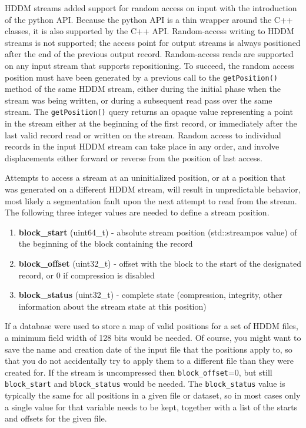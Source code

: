\documentclass{revtex4}
\begin{document}
HDDM streams added support for random access on input with the introduction
of the python API. Because the python API is a thin wrapper around the C++
classes, it is also supported by the C++ API. Random-{}access writing to HDDM
streams is not supported; the access point for output streams is always
positioned after the end of the previous output record. Random-access reads
are supported on any input stream that supports repositioning. To succeed,
the random access position must have been generated by a previous call to
the \texttt{getPosition()} method of the same HDDM stream, either during the
initial phase when the stream was being written, or during a subsequent read
pass over the same stream. The \texttt{getPosition()} query returns an opaque
value representing a point in the stream either at the beginning of the first
record, or immediately after the last valid record read or written on the 
stream. Random access to individual records in the input HDDM stream can
take place in any order, and involve displacements either forward or reverse
from the position of last access. 

Attempts to access a stream at an uninitialized position, or at a position
that was generated on a different HDDM stream, will result in unpredictable
behavior, most likely a segmentation fault upon the next attempt to read
from the stream. The following three integer values are needed to define
a stream position.

\begin{enumerate}
\item {\bfseries block\_start} (uint64\_t) -{} absolute stream position 
(std::streampos value) of the beginning of the block containing the record
\item {\bfseries block\_offset} (uint32\_t) -{} offset with the block to
the start of the designated record, or 0 if compression is disabled
\item {\bfseries block\_status} (uint32\_t) -{} complete state (compression,
integrity, other information about the stream state at this position)
\end{enumerate}

If a database were used to store a map of valid positions for a set of HDDM
files, a minimum field width of 128 bits would be needed. Of course, you might
want to save the name and creation date of the input file that the positions
apply to, so that you do not accidentally try to apply them to a different
file than they were created for. If the stream is uncompressed then 
\texttt{block\_offset}=0, but still \texttt{block\_start} and 
\texttt{block\_status} would be needed. The \texttt{block\_status} value is
typically the same for all positions in a given file or dataset, so in most
cases only a single value for that variable needs to be kept, together with
a list of the starts and offsets for the given file.
\end{document}
